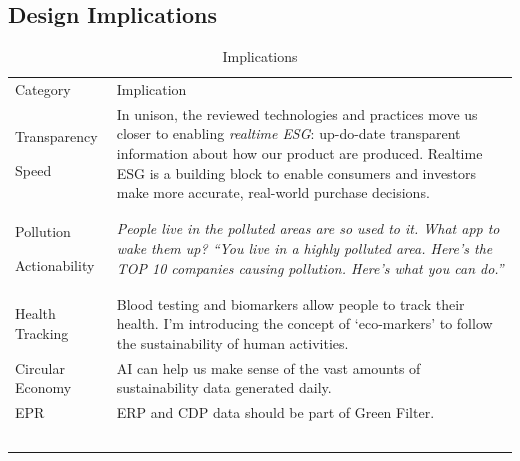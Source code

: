 \documentclass[
  letterpaper,
  DIV=11,
  numbers=noendperiod]{scrartcl}
\begin{document}
\subsection{Design Implications}\label{design-implications}

\begin{longtable}[]{@{}
  >{\raggedright\arraybackslash}p{}
  >{\raggedright\arraybackslash}p{}@{}}
\caption{Implications}\tabularnewline
\toprule\noalign{}
\endfirsthead
\endhead
\bottomrule\noalign{}
\endlastfoot
Category & Implication \\
Transparency

Speed & In unison, the reviewed technologies and practices move us
closer to enabling \emph{realtime ESG}: up-do-date transparent
information about how our product are produced. Realtime ESG is a
building block to enable consumers and investors make more accurate,
real-world purchase decisions. \\
Pollution

Actionability & \emph{People live in the polluted areas are so used to
it. What app to wake them up? ``You live in a highly polluted area.
Here's the TOP 10 companies causing pollution. Here's what you can
do.''} \\
Health Tracking & Blood testing and biomarkers allow people to track
their health. I'm introducing the concept of `eco-markers' to follow the
sustainability of human activities. \\
Circular Economy & AI can help us make sense of the vast amounts of
sustainability data generated daily. \\
EPR & ERP and CDP data should be part of Green Filter. \\
& \\
& \\
& \\
& \\
& \\
\end{longtable}
\end{document}

